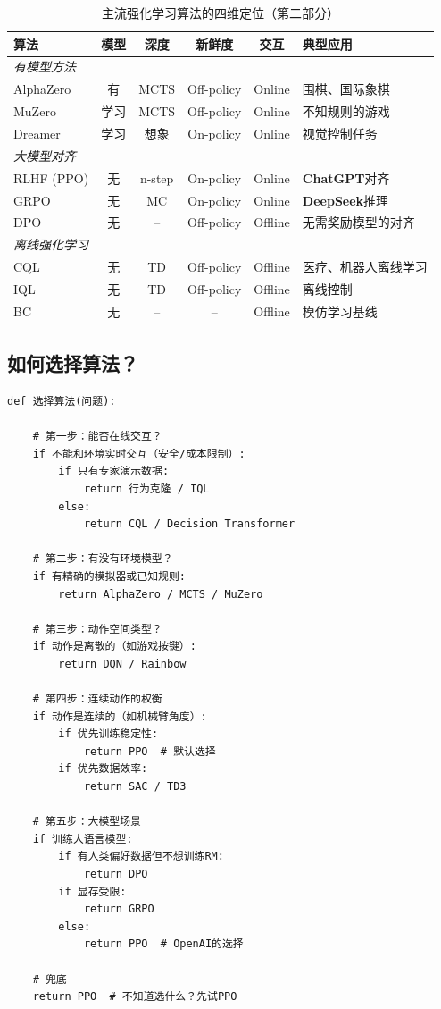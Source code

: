 \begin{table}[htbp]
\centering
\small
\renewcommand{\arraystretch}{1.35}
\caption{主流强化学习算法的四维定位（第二部分）}
\begin{tabular}{l|c|c|c|c|p{3.5cm}}
\toprule
\textbf{算法} & \textbf{模型} & \textbf{深度} & \textbf{新鲜度} & \textbf{交互} & \textbf{典型应用} \\
\midrule
\multicolumn{6}{l}{\textit{有模型方法}} \\
\midrule
AlphaZero & 有 & MCTS & Off-policy & Online & 围棋、国际象棋 \\
MuZero & 学习 & MCTS & Off-policy & Online & 不知规则的游戏 \\
Dreamer & 学习 & 想象 & On-policy & Online & 视觉控制任务 \\
\midrule
\multicolumn{6}{l}{\textit{大模型对齐}} \\
\midrule
RLHF (PPO) & 无 & n-step & On-policy & Online & \textbf{ChatGPT}对齐 \\
GRPO & 无 & MC & On-policy & Online & \textbf{DeepSeek}推理 \\
DPO & 无 & -- & Off-policy & Offline & 无需奖励模型的对齐 \\
\midrule
\multicolumn{6}{l}{\textit{离线强化学习}} \\
\midrule
CQL & 无 & TD & Off-policy & Offline & 医疗、机器人离线学习 \\
IQL & 无 & TD & Off-policy & Offline & 离线控制 \\
BC & 无 & -- & -- & Offline & 模仿学习基线 \\
\bottomrule
\end{tabular}
\end{table}




\subsection{如何选择算法？}

\begin{lstlisting}[style=decision, caption={强化学习算法选择指南}]
def 选择算法(问题):
    
    # 第一步：能否在线交互？
    if 不能和环境实时交互（安全/成本限制）:
        if 只有专家演示数据:
            return 行为克隆 / IQL
        else:
            return CQL / Decision Transformer
    
    # 第二步：有没有环境模型？
    if 有精确的模拟器或已知规则:
        return AlphaZero / MCTS / MuZero
    
    # 第三步：动作空间类型？
    if 动作是离散的（如游戏按键）:
        return DQN / Rainbow
    
    # 第四步：连续动作的权衡
    if 动作是连续的（如机械臂角度）:
        if 优先训练稳定性:
            return PPO  # 默认选择
        if 优先数据效率:
            return SAC / TD3
    
    # 第五步：大模型场景
    if 训练大语言模型:
        if 有人类偏好数据但不想训练RM:
            return DPO
        if 显存受限:
            return GRPO
        else:
            return PPO  # OpenAI的选择
    
    # 兜底
    return PPO  # 不知道选什么？先试PPO
\end{lstlisting}

